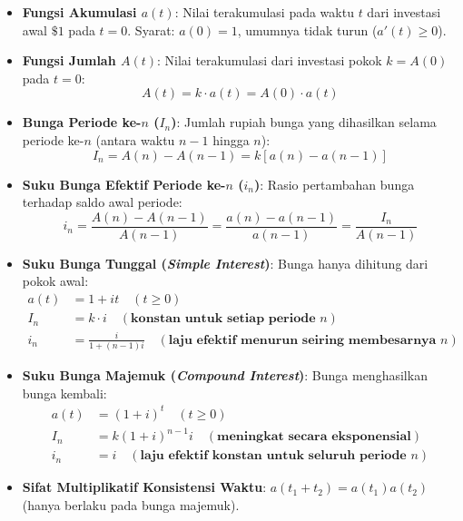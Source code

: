 \documentclass[10pt,a4paper]{article}
\begin{document}
\begin{rumusbox}
\begin{itemize}[leftmargin=1.5em, topsep=1.5pt, itemsep=2pt]
    \item \textbf{Fungsi Akumulasi $a(t)$}: Nilai terakumulasi pada waktu $t$ dari investasi awal $\$1$ pada $t=0$. Syarat: $a(0)=1$, umumnya tidak turun ($a'(t) \ge 0$).
    \item \textbf{Fungsi Jumlah $A(t)$}: Nilai terakumulasi dari investasi pokok $k = A(0)$ pada $t=0$:
    \begin{equation*}
        A(t) = k \cdot a(t) = A(0) \cdot a(t)
    \end{equation*}
    \item \textbf{Bunga Periode ke-$n$ ($I_n$)}: Jumlah rupiah bunga yang dihasilkan selama periode ke-$n$ (antara waktu $n-1$ hingga $n$):
    \begin{equation*}
        I_n = A(n) - A(n-1) = k \left[ a(n) - a(n-1) \right]
    \end{equation*}
    \item \textbf{Suku Bunga Efektif Periode ke-$n$ ($i_n$)}: Rasio pertambahan bunga terhadap saldo awal periode:
    \begin{equation*}
        i_n = \frac{A(n) - A(n-1)}{A(n-1)} = \frac{a(n) - a(n-1)}{a(n-1)} = \frac{I_n}{A(n-1)}
    \end{equation*}
\end{itemize}
\end{rumusbox}

\begin{teoremabox}
\begin{itemize}[leftmargin=1.5em, topsep=1.5pt, itemsep=2pt]
    \item \textbf{Suku Bunga Tunggal (\textit{Simple Interest})}: Bunga hanya dihitung dari pokok awal:
    \begin{align*}
        a(t) &= 1 + it \quad (t \ge 0) \\
        I_n &= k \cdot i \quad (\textbf{konstan untuk setiap periode } n) \\
        i_n &= \frac{i}{1 + (n-1)i} \quad (\textbf{laju efektif menurun seiring membesarnya } n)
    \end{align*}
    \item \textbf{Suku Bunga Majemuk (\textit{Compound Interest})}: Bunga menghasilkan bunga kembali:
    \begin{align*}
        a(t) &= (1+i)^t \quad (t \ge 0) \\
        I_n &= k(1+i)^{n-1} i \quad (\textbf{meningkat secara eksponensial}) \\
        i_n &= i \quad (\textbf{laju efektif konstan untuk seluruh periode } n)
    \end{align*}
    \item \textbf{Sifat Multiplikatif Konsistensi Waktu}: $a(t_1 + t_2) = a(t_1) a(t_2)$ (hanya berlaku pada bunga majemuk).
\end{itemize}
\end{teoremabox}
\end{document}
